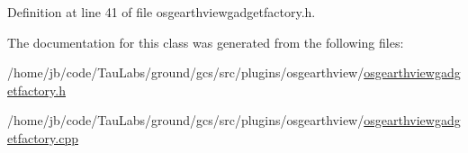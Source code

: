 \-Definition at line 41 of file osgearthviewgadgetfactory.\-h.



\-The documentation for this class was generated from the following files\-:\begin{DoxyCompactItemize}
\item 
/home/jb/code/\-Tau\-Labs/ground/gcs/src/plugins/osgearthview/\hyperlink{osgearthviewgadgetfactory_8h}{osgearthviewgadgetfactory.\-h}\item 
/home/jb/code/\-Tau\-Labs/ground/gcs/src/plugins/osgearthview/\hyperlink{osgearthviewgadgetfactory_8cpp}{osgearthviewgadgetfactory.\-cpp}\end{DoxyCompactItemize}

